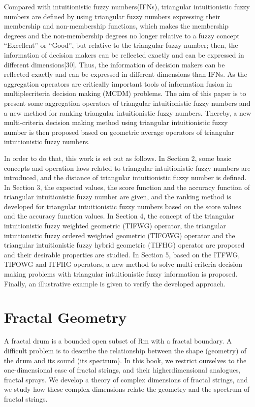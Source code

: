 \documentclass[a4paper]{article}
\begin{document}
Compared with intuitionistic fuzzy numbers(IFNs), triangular intuitionistic fuzzy 
numbers are defined by using triangular fuzzy numbers expressing their membership and 
non-membership functions, which makes the membership degrees and the non-membership 
degrees no longer relative to a fuzzy concept “Excellent” or “Good”, but relative to the 
triangular fuzzy number; then, the information of decision makers can be reflected exactly 
and can be expressed in different dimensions[30]. Thus, the information of decision makers 
can be reflected exactly and can be expressed in different dimensions than IFNs. As the 
aggregation operators are critically important tools of information fusion in multiplecriteria decision making (MCDM) problems. The aim of this paper is to present some 
aggregation operators of triangular intuitionistic fuzzy numbers and a new method for 
ranking triangular intuitionistic fuzzy numbers. Thereby, a new multi-criteria decision 
making method using triangular intuitionistic fuzzy number is then proposed based on 
geometric average operators of triangular intuitionistic fuzzy numbers. 

In order to do that, this work is set out as follows. In Section 2, some basic concepts and 
operation laws related to triangular intuitionistic fuzzy numbers are introduced, and the 
distance of triangular intuitionistic fuzzy number is defined. In Section 3, the expected 
values, the score function and the accuracy function of triangular intuitionistic fuzzy 
number are given, and the ranking method is developed for triangular intuitionistic fuzzy 
numbers based on the score values and the accuracy function values. In Section 4, the 
concept of the triangular intuitionistic fuzzy weighted geometric (TIFWG) operator, the 
triangular intuitionistic fuzzy ordered weighted geometric (TIFOWG) operator and the 
triangular intuitionistic fuzzy hybrid geometric (TIFHG) operator are proposed and their 
desirable properties are studied. In Section 5, based on the ITFWG, TIFOWG and ITFHG 
operators, a new method to solve multi-criteria decision making problems with triangular 
intuitionistic fuzzy information is proposed. Finally, an illustrative example is given to 
verify the developed approach.


\section{Fractal Geometry}

A fractal drum is a bounded open subset of Rm with a fractal boundary. A difficult problem is to describe the relationship between the shape (geometry) of the drum and its sound (its spectrum). In this book, we restrict ourselves to the one-dimensional case of fractal strings, and their higherdimensional analogues, fractal sprays. We develop a theory of complex dimensions of fractal strings, and we study how these complex dimensions relate the geometry and the spectrum of fractal strings.
\end{document}
